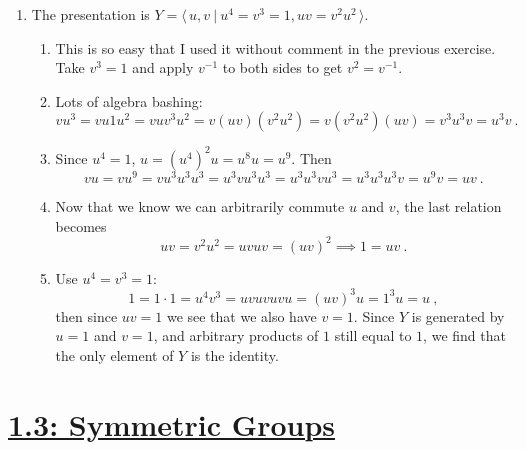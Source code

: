 \documentclass[]{article}
\begin{document}
\begin{enumerate}
\item The presentation is $Y = \langle\, u,v \ \vert\ u^4=v^3=1, uv=v^2u^2\, \rangle$.
\begin{enumerate}
\item This is so easy that I used it without comment in the previous exercise. Take $v^3 = 1$ and apply $v^{-1}$ to both sides to get $v^2 = v^{-1}$.
\item Lots of algebra bashing:
\begin{equation}
vu^3 = vu1u^2 = vuv^3u^2 = v(uv)(v^2u^2) = v(v^2u^2)(uv) = v^3u^3v = u^3v\ .
\end{equation}
\item Since $u^4 = 1$, $u = (u^4)^2u = u^8u = u^9$. Then
\begin{equation}
vu = vu^9 = vu^3u^3u^3 = u^3vu^3u^3 = u^3u^3vu^3 = u^3u^3u^3v = u^9v = uv\ .
\end{equation}
\item Now that we know we can arbitrarily commute $u$ and $v$, the last relation becomes
\begin{equation}
uv = v^2u^2 = uvuv = (uv)^2 \implies 1 = uv\ .
\end{equation}
\item Use $u^4 = v^3 = 1$:
\begin{equation}
1 = 1\cdot 1 = u^4v^3 = uvuvuvu = (uv)^3u = 1^3u = u\ ,
\end{equation}
then since $uv = 1$ we see that we also have $v = 1$. Since $Y$ is generated by $u=1$ and $v=1$, and arbitrary products of $1$ still equal to $1$, we find that the only element of $Y$ is the identity.
\end{enumerate}


\end{enumerate}












\section*{\underline{1.3: Symmetric Groups}}
\end{document}
